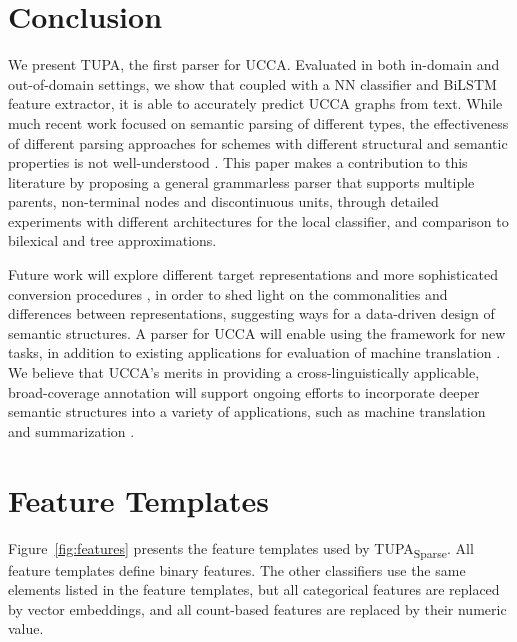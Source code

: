 \documentclass[11pt,a4paper]{article}
\newcommand{\parser}[1]{TUPA\textsubscript{#1}}
\newcommand{\figref}[1]{Figure~\ref{#1}}
\begin{document}
\section{Conclusion}\label{sec:conclusion}
We present \parser{}, the first parser for UCCA.
Evaluated in both in-domain and out-of-domain settings, we show that coupled with a
NN classifier and BiLSTM feature extractor,
it is able to accurately predict UCCA graphs from text.
While much recent work focused on semantic parsing of different types,
the effectiveness of different parsing approaches for schemes with
different structural and semantic properties is not well-understood 
\cite{kuhlmann2016towards}.
This paper makes a contribution to this literature by proposing a general grammarless parser
that supports multiple parents, non-terminal nodes and discontinuous units, through detailed
experiments with different architectures for the local classifier, and comparison to bilexical
and tree approximations.

Future work will explore different target
representations and more sophisticated conversion procedures \cite{kong-15},
in order to shed light on the commonalities and differences between
representations, suggesting ways for a data-driven design of semantic structures.
A parser for UCCA will enable using the framework for new tasks,
in addition to existing applications for evaluation of
machine translation \cite{birch2016hume}.
We believe that UCCA's merits in providing a cross-linguistically applicable,
broad-coverage annotation will support ongoing efforts to incorporate deeper
semantic structures into a variety of applications,
such as machine translation \cite{jones2012semantics}
and summarization \cite{liu2015toward}.

\newpage








\newpage
\appendix
\section{Feature Templates}
\label{appendix:features}

\figref{fig:features} presents the feature templates used by \parser{Sparse}.
All feature templates define binary features.
The other classifiers use the same elements listed in the feature templates,
but all categorical features are replaced by vector embeddings,
and all count-based features are replaced by their numeric value.
\end{document}
